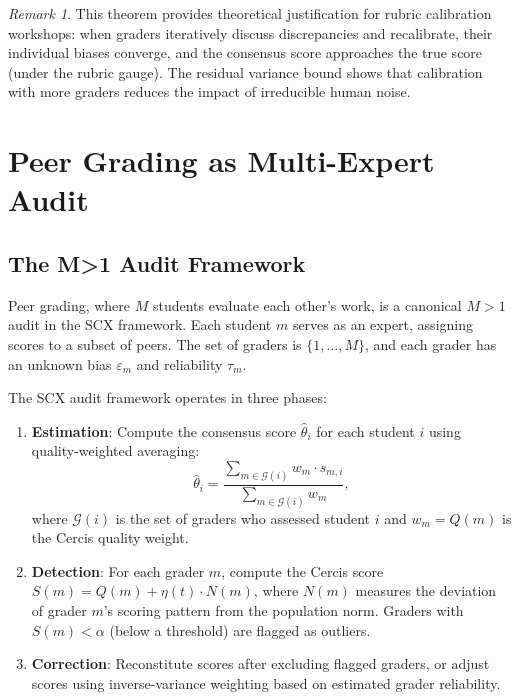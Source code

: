 \documentclass[12pt,a4paper]{article}
\theoremstyle{remark}
\newtheorem{remark}[theorem]{Remark}
\begin{document}
\begin{remark}
This theorem provides theoretical justification for rubric calibration workshops: when graders iteratively discuss discrepancies and recalibrate, their individual biases converge, and the consensus score approaches the true score (under the rubric gauge). The residual variance bound shows that calibration with more graders reduces the impact of irreducible human noise.
\end{remark}

\section{Peer Grading as Multi-Expert Audit}

\subsection{The M>1 Audit Framework}

Peer grading, where $M$ students evaluate each other's work, is a canonical $M>1$ audit in the SCX framework. Each student $m$ serves as an expert, assigning scores to a subset of peers. The set of graders is $\{1,\dots,M\}$, and each grader has an unknown bias $\varepsilon_m$ and reliability $\tau_m$.

The SCX audit framework \cite{scx2026} operates in three phases:

\begin{enumerate}
    \item \textbf{Estimation}: Compute the consensus score $\hat{\theta}_i$ for each student $i$ using quality-weighted averaging:
    \begin{equation}
    \hat{\theta}_i = \frac{\sum_{m \in \mathcal{G}(i)} w_m \cdot s_{m,i}}{\sum_{m \in \mathcal{G}(i)} w_m},
    \label{eq:consensus}
    \end{equation}
    where $\mathcal{G}(i)$ is the set of graders who assessed student $i$ and $w_m = Q(m)$ is the Cercis quality weight.

    \item \textbf{Detection}: For each grader $m$, compute the Cercis score $S(m) = Q(m) + \eta(t) \cdot N(m)$, where $N(m)$ measures the deviation of grader $m$'s scoring pattern from the population norm. Graders with $S(m) < \alpha$ (below a threshold) are flagged as outliers.

    \item \textbf{Correction}: Reconstitute scores after excluding flagged graders, or adjust scores using inverse-variance weighting based on estimated grader reliability.
\end{enumerate}
\end{document}
